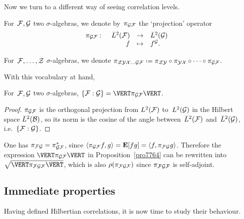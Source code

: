 Now we turn to a different way of seeing correlation levels.

\begin{Def}
For~$\mathcal{F}, \mathcal{G}$ two $\sigma$-algebras, we denote by~$\pi_{\mathcal{G}\mathcal{F}}$
the `projection' operator
\[\label{for0595} \begin{array}{rrcl} \pi_{\mcal{G}\mcal{F}} \colon & \ldb(\mcal{F}) & \to & \ldb(\mcal{G}) \\ & f & \mapsto & f^{\mcal{G}}. \end{array} \]

For~$\mathcal{F}, \ldots, \mathcal{Z}$ $\sigma$-algebras,
we denote $\pi_{\mcal{Z}\mcal{Y}\mcal{X}\ldots\mcal{G}\mcal{F}} \coloneqq
\pi_{\mcal{Z}\mcal{Y}} \circ \ab \pi_{\mcal{Y}\mcal{X}} \circ \ab \cdots \circ \pi_{\mcal{G}\mcal{F}}$.
\end{Def}

With this vocabulary at hand,
\begin{Pro}\label{pro7764}
For~$\mathcal{F}, \mathcal{G}$ two $\sigma$-algebras, $\{\mcal{F}:\mcal{G}\} = \VERT \pi_{\mcal{G}\mcal{F}} \VERT$.
\end{Pro}

\begin{proof}
$\pi_{\mathcal{G}\mathcal{F}}$ is the orthogonal projection from $\ldb(\mcal{F})$
to~$\ldb(\mcal{G})$ in the Hilbert space $\ldb(\mcal{B})$,
so its norm is the cosine of the angle between~$\ldb(\mcal{F})$ and~$\ldb(\mcal{G})$,
i.e.\ ${\{\mathcal{F}:\mathcal{G}\}}$.
\end{proof}

\begin{Rmk}\label{rmk1265}
One has $\pi_{\mathcal{F}\mathcal{G}} = \pi_{\mathcal{G}\mathcal{F}}^*$,
since $\langle \pi_{\mathcal{G}\mathcal{F}}f , g \rangle = \mathop{\smash{\mathbf{E}}}\nolimits[fg] = \langle f , \pi_{\mathcal{F}\mathcal{G}}g \rangle$.
Therefore the expression $\VERT \pi_{\mcal{G}\mcal{F}} \VERT$ in Proposition~\ref{pro7764}
can be rewritten into $\sqrt{\VERT \pi_{\mcal{F}\mcal{G}\mcal{F}} \VERT}$,
which is also $\rho(\pi_{\mathcal{F}\mathcal{G}\mathcal{F}})$
since $\pi_{\mathcal{F}\mathcal{G}\mathcal{F}}$ is self-adjoint.
\end{Rmk}



\subsection{Immediate properties}

Having defined Hilbertian correlations, it is now time to study their behaviour.

